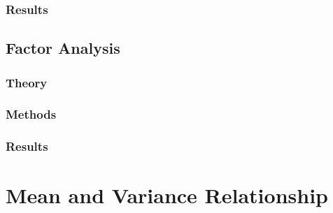 \documentclass[12pt]{report}
\begin{document}
\subsection{Results}
\section{Factor Analysis}
\subsection{Theory}
\subsection{Methods}
\subsection{Results}
\chapter{Mean and Variance Relationship}




\end{document}
